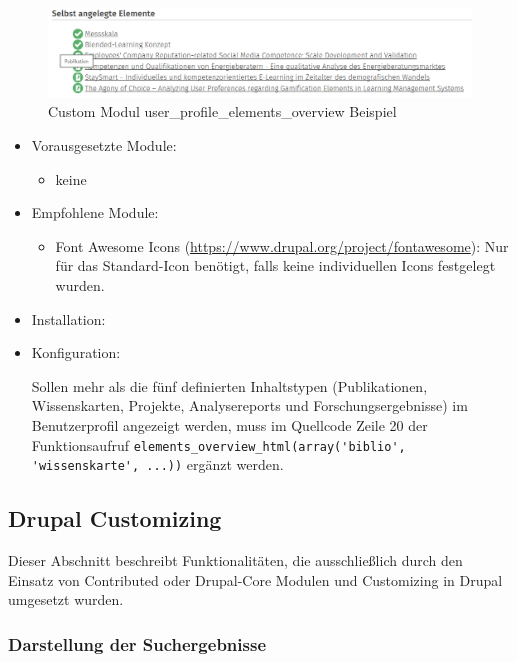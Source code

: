 \begin{figure}[H]
	\centering
	\includegraphics[width=0.80\linewidth]{images/example_userprofile}
	\caption{Custom Modul user\_profile\_elements\_overview Beispiel}
	\label{fig:example_userprofile}
\end{figure}

\begin{itemize}[parsep=0pt, itemsep=5.0pt plus 2.0pt minus 1.0pt, leftmargin=*]
	\item Vorausgesetzte Module:
	\begin{itemize}
		\item keine
	\end{itemize}
	
	\item Empfohlene Module:
	\begin{itemize}
		\item Font Awesome Icons (\url{https://www.drupal.org/project/fontawesome}): Nur für das Standard-Icon benötigt, falls keine individuellen Icons festgelegt wurden.
	\end{itemize}
	
	\item Installation: \standardinstall
	
	
	\item Konfiguration:
	
	\noconfig
	
	Sollen mehr als die fünf definierten Inhaltstypen (Publikationen, Wissenskarten, Projekte, Analysereports und Forschungsergebnisse) im Benutzerprofil angezeigt werden, muss im Quellcode Zeile 20 der Funktionsaufruf \lstinline|elements_overview_html(array('biblio', 'wissenskarte', ...))| ergänzt werden.	
\end{itemize}



\newpage
\subsection{Drupal Customizing}\label{sub:drupal_customizing}
Dieser Abschnitt beschreibt Funktionalitäten, die ausschließlich durch den Einsatz von Contributed oder Drupal-Core Modulen und Customizing in Drupal umgesetzt wurden.

\subsubsection{Darstellung der Suchergebnisse}\label{subsub:suchergebnisse}

